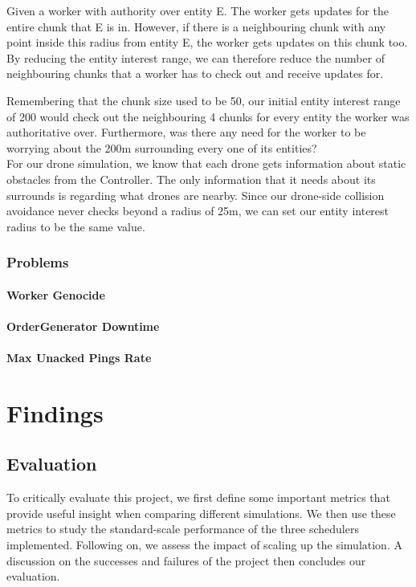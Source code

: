 \documentclass[a4paper,11pt,titlepage]{report}
\begin{document}
Given a worker with authority over entity E. The worker gets updates for the entire chunk that E is in. However, if there is a neighbouring chunk with any point inside this radius from entity E, the worker gets updates on this chunk too. By reducing the entity interest range, we can therefore reduce the number of neighbouring chunks that a worker has to check out and receive updates for.

\clearpage
Remembering that the chunk size used to be 50, our initial entity interest range of 200 would check out the neighbouring 4 chunks for every entity the worker was authoritative over. Furthermore, was there any need for the worker to be worrying about the 200m surrounding every one of its entities?\\

For our drone simulation, we know that each drone gets information about static obstacles from the Controller. The only information that it needs about its surrounds is regarding what drones are nearby. Since our drone-side collision avoidance never checks beyond a radius of 25m, we can set our entity interest radius to be the same value.

\section{Problems}
\subsection{Worker Genocide}
\subsection{OrderGenerator Downtime}
\subsection{Max Unacked Pings Rate}


\newpage
\part{Findings}
\chapter{Evaluation}
To critically evaluate this project, we first define some important metrics that provide useful insight when comparing different simulations. We then use these metrics to study the standard-scale performance of the three schedulers implemented. Following on, we assess the impact of scaling up the simulation. A discussion on the successes and failures of the project then concludes our evaluation.
\end{document}
